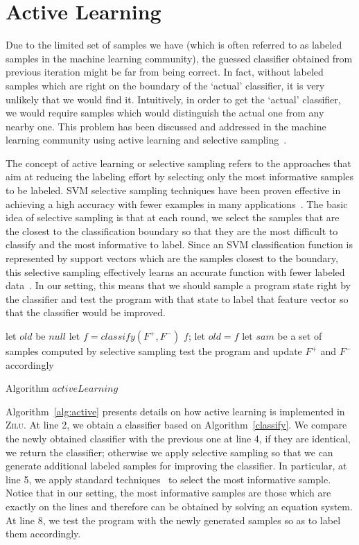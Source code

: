 \section{Active Learning}
Due to the limited set of samples we have (which is often referred to as labeled samples in the machine learning community), 
the guessed classifier obtained from previous iteration might be far from being correct. 
In fact, without labeled samples which are right on the boundary of the `actual' classifier, 
it is very unlikely that we would find it. 
Intuitively, in order to get the `actual' classifier, we would require samples which would distinguish the actual one from any nearby one. 
This problem has been discussed and addressed in the machine learning community using active learning and selective sampling~\cite{DBLP:conf/icml/SchohnC00}.

The concept of active learning or selective sampling refers to the approaches 
that aim at reducing the labeling effort by selecting only the most informative samples to be labeled. 
SVM selective sampling techniques have been proven effective in achieving a high accuracy 
with fewer examples in many applications~\cite{DBLP:conf/mm/TongC01,DBLP:journals/jmlr/TongK01}. 
The basic idea of selective sampling is that at each round, 
we select the samples that are the closest to the classification boundary so that they are the most difficult to classify and the most informative to label. 
Since an SVM classification function is represented by support vectors which are the samples closest to the boundary, 
this selective sampling effectively learns an accurate function with fewer labeled data~\cite{DBLP:conf/icml/SchohnC00}. 
In our setting, this means that we should sample a program state right by the classifier and test the program 
with that state to label that feature vector so that the classifier would be improved.

\begin{algorithm}[t]
\SetAlgoVlined
\Indm
{}
\Indp
let $old$ be $null$\;
 {
    let $f = classify(F^+, F^-)$\;
     {
        \Return $f$;
    }
    let $old = f$\;
    let $sam$ be a set of samples computed by selective sampling\;
    test the program and update $F^+$ and $F^-$ accordingly\;
}
\caption{Algorithm $activeLearning$}
\label{alg:active}
\end{algorithm}

Algorithm~\ref{alg:active} presents details on how active learning is implemented in \textsc{Zilu}. 
At line 2, we obtain a classifier based on Algorithm~\ref{classify}. 
We compare the newly obtained classifier with the previous one at line 4, if they are identical, we return the classifier; 
otherwise we apply selective sampling so that we can generate additional labeled samples for improving the classifier. 
In particular, at line 5, we apply standard techniques~\cite{DBLP:conf/icml/SchohnC00} to select the most informative sample. 
Notice that in our setting, the most informative samples are those which are exactly on the lines and therefore can be obtained by solving an equation system. 
At line 8, we test the program with the newly generated samples so as to label them accordingly.

